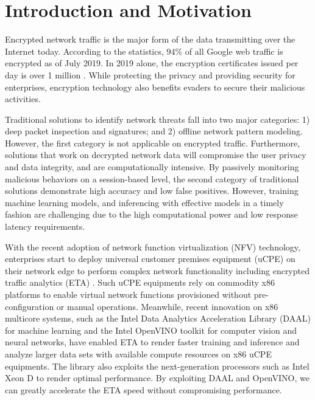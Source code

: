 \section{Introduction and Motivation}
\label{sec:intro}

Encrypted network traffic is the major form of the data transmitting over the Internet today. According to the statistics, 94\% of all Google web traffic is encrypted \cite{google:https} as of July 2019. In 2019 alone, the encryption certificates issued per day is over 1 million \cite{letsencrypt}. While protecting the privacy and providing security for enterprises, encryption technology also benefits evaders to secure their malicious activities. 

Traditional solutions to identify network threats fall into two major categories: 1) deep packet inspection and signatures; and 2) offline network pattern modeling. However, the first category is not applicable on encrypted traffic. Furthermore, solutions that work on decrypted network data will compromise the user privacy and data integrity, and are computationally intensive. By passively monitoring malicious behaviors on a session-based level, the second category of traditional solutions \cite{Anderson:2016, Anderson:2017} demonstrate high accuracy and low false positives. However, training machine learning models, and inferencing with effective models in a timely fashion are challenging due to the high computational power and low response latency requirements.  

With the recent adoption of network function virtualization (NFV) technology, enterprises start to deploy universal customer premises equipment (uCPE) on their network edge to perform complex network functionality including encrypted traffic analytics (ETA) \cite{cisco:eta, intel:ucpe, adva:ucpe}. Such uCPE equipments rely on commodity x86 platforms to enable virtual network functions provisioned without pre-configuration or manual operations. Meanwhile, recent innovation on x86 multicore systems, such as the Intel Data Analytics Acceleration Library (DAAL) \cite{daal} for machine learning and the Intel OpenVINO toolkit \cite{openvino} for computer vision and neural networks, have enabled ETA to render faster training and inference and analyze larger data sets with available compute resources on x86 uCPE equipments. The library also exploits the next-generation processors such as Intel Xeon D \cite{xeond} to render optimal performance. By exploiting DAAL and OpenVINO, we can greatly accelerate the ETA speed without compromising performance.


